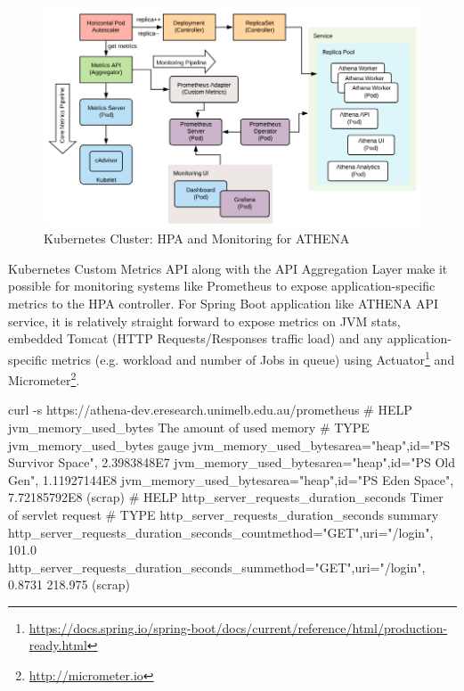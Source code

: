 \begin{figure}[H]
\centering
\includegraphics[width=0.7\paperwidth]{Figures/KUBE_monitoring}
\decoRule
\caption[Kubernetes Cluster: HPA and Monitoring for ATHENA]{Kubernetes Cluster: HPA and Monitoring for ATHENA}
\label{fig:kubeMonitAthena}
\end{figure}

Kubernetes Custom Metrics API along with the API Aggregation Layer make it possible for monitoring systems like Prometheus to expose application-specific metrics to the HPA controller. For Spring Boot application like ATHENA API service, it is relatively straight forward to expose metrics on JVM stats, embedded Tomcat (HTTP Requests/Responses traffic load) and any application-specific metrics (e.g. workload and number of Jobs in queue) using Actuator\footnote{\url{https://docs.spring.io/spring-boot/docs/current/reference/html/production-ready.html}} and Micrometer\footnote{\url{http://micrometer.io}}. 
\begin{small}
\begin{lcverbatim}
curl -s https://athena-dev.eresearch.unimelb.edu.au/prometheus
# HELP jvm_memory_used_bytes The amount of used memory
# TYPE jvm_memory_used_bytes gauge
jvm_memory_used_bytes{area="heap",id="PS Survivor Space",} 2.3983848E7
jvm_memory_used_bytes{area="heap",id="PS Old Gen",} 1.11927144E8
jvm_memory_used_bytes{area="heap",id="PS Eden Space",} 7.72185792E8
(scrap)
# HELP http_server_requests_duration_seconds Timer of servlet request
# TYPE http_server_requests_duration_seconds summary
http_server_requests_duration_seconds_count{method="GET",uri="/login",} 101.0
http_server_requests_duration_seconds_sum{method="GET",uri="/login",} 0.8731 218.975
(scrap)
\end{lcverbatim}
\end{small}


